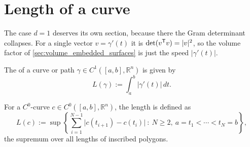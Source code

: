 
\section{Length of a curve}
\label{sec:length_of_curve}

The case $d = 1$ deserves its own section, because there the Gram determinant collapses. For a
single vector $v = \gamma'(t)$ it is $\det(v^{\mathsf{T}} v) = \lvert v\rvert^2$, so the volume factor
of \cref{sec:volume_embedded_surfaces} is just the speed $\lvert\gamma'(t)\rvert$.

\begin{definition}
\label{def:length_c1_curve}
The   of a curve or path $\gamma \in
C^1([a,b],\mathbb{R}^n)$ is given by
\[L(\gamma) := \int_a^b \lvert\gamma'(t)\rvert\,dt.\]
\end{definition}

\begin{definition}
\label{def:length_c0_curve}
For a $C^0$-curve $c \in C^0([a,b],\mathbb{R}^n)$, the length is defined as
\[L(c) := \sup\left\{\sum_{i=1}^{N-1} \lvert c(t_{i+1})-c(t_i)\rvert
  \ :\ N \geq 2,\ a = t_1 < \cdots < t_N = b\right\},\]
the supremum over all lengths of inscribed polygons.
\end{definition}

